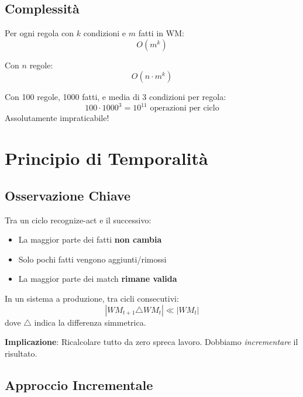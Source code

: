 \subsection{Complessità}

Per ogni regola con $k$ condizioni e $m$ fatti in WM:
\begin{equation}
O(m^k)
\end{equation}

Con $n$ regole:
\begin{equation}
O(n \cdot m^k)
\end{equation}

\begin{warningbox}
Con 100 regole, 1000 fatti, e media di 3 condizioni per regola:
\begin{equation}
100 \cdot 1000^3 = 10^{11} \text{ operazioni per ciclo}
\end{equation}
Assolutamente impraticabile!
\end{warningbox}

\section{Principio di Temporalità}

\subsection{Osservazione Chiave}

Tra un ciclo recognize-act e il successivo:
\begin{itemize}
\item La maggior parte dei fatti \textbf{non cambia}
\item Solo pochi fatti vengono aggiunti/rimossi
\item La maggior parte dei match \textbf{rimane valida}
\end{itemize}

\begin{definizione}
In un sistema a produzione, tra cicli consecutivi:
\begin{equation}
|WM_{t+1} \triangle WM_t| \ll |WM_t|
\end{equation}
dove $\triangle$ indica la differenza simmetrica.
\end{definizione}

\textbf{Implicazione}: Ricalcolare tutto da zero spreca lavoro. Dobbiamo \textit{incrementare} il risultato.

\subsection{Approccio Incrementale}

